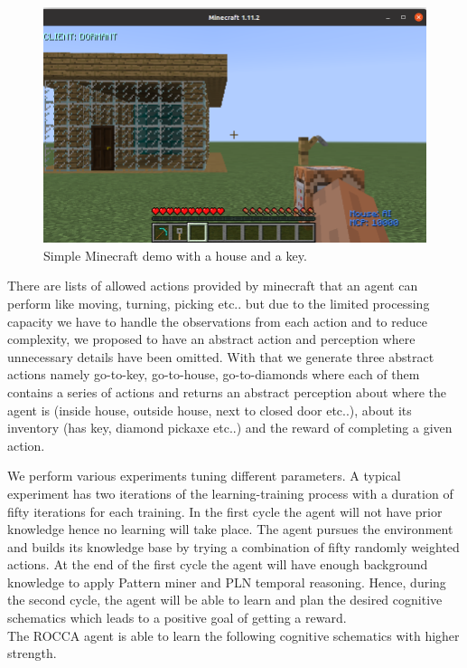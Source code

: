 \documentclass[runningheads]{llncs}
\begin{document}
\begin{figure}[htbp]
\centerline{\includegraphics[scale=.2]{pictures/simple_demo.png}}
\caption{Simple Minecraft demo with a house and a key.}
\label{fig:minecraft}
\end{figure}

There are lists of allowed actions provided by minecraft that an agent can perform like moving, turning, picking etc.. but due to the limited processing capacity we have to handle the observations from each action and to reduce complexity, we proposed to have an abstract action and perception where unnecessary details have been omitted. With that we generate three abstract actions namely go-to-key, go-to-house, go-to-diamonds where each of them contains a series of actions and returns an abstract perception about where the agent is (inside house, outside house, next to closed door etc..), about its inventory (has key, diamond pickaxe etc..) and the reward of completing a given action. \par
We perform various experiments tuning different parameters. A typical experiment has two iterations of the learning-training process with a duration of fifty iterations for each training. In the first cycle the agent will not have prior knowledge hence no learning will take place. The agent pursues the environment and builds its knowledge base by trying a combination of fifty randomly weighted actions. At the end of the first cycle the agent will have enough background knowledge to apply Pattern miner and PLN temporal reasoning. Hence, during the second cycle, the agent will be able to learn and plan the desired cognitive schematics which leads to a positive goal of getting a reward.\\
The ROCCA agent is able to learn the following cognitive schematics with higher strength.
\end{document}
